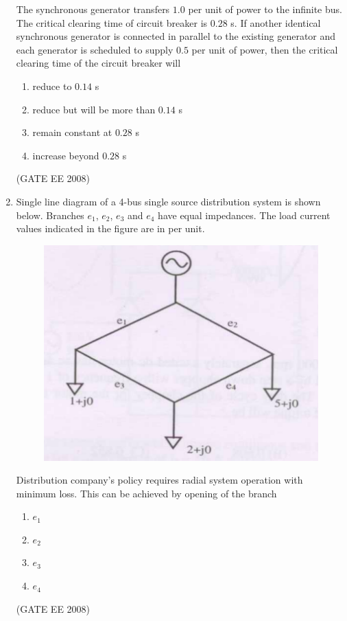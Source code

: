 \documentclass[journal,12pt,onecolumn]{IEEEtran}
\theoremstyle{remark}
\begin{document}
\begin{enumerate}[start=1, label=Q.\arabic*]
The synchronous generator transfers $1.0$ per unit of power to the infinite bus. The critical clearing time of circuit breaker is $0.28$ s. If another identical synchronous generator is connected in parallel to the existing generator and each generator is scheduled to supply $0.5$ per unit of power, then the critical clearing time of the circuit breaker will

\begin{enumerate}[label=(\Alph*)]
    \item reduce to $0.14$ s
    \item reduce but will be more than $0.14$ s
    \item remain constant at $0.28$ s
    \item increase beyond $0.28$ s
\end{enumerate}
\hfill (GATE EE 2008)


\item Single line diagram of a 4-bus single source distribution system is shown below. Branches $e_1$, $e_2$, $e_3$ and $e_4$ have equal impedances. The load current values indicated in the figure are in per unit.

\begin{figure}[H]
    \centering
    \includegraphics[width=\columnwidth]{Fig/q54.png}
\end{figure}

Distribution company's policy requires radial system operation with minimum loss. This can be achieved by opening of the branch

\begin{multicols}{4}
\begin{enumerate}[label=(\Alph*)]
    \item $e_1$
    \item $e_2$
    \item $e_3$
    \item $e_4$
\end{enumerate}
\end{multicols}
\hfill (GATE EE 2008)




\end{enumerate}
\end{document}
